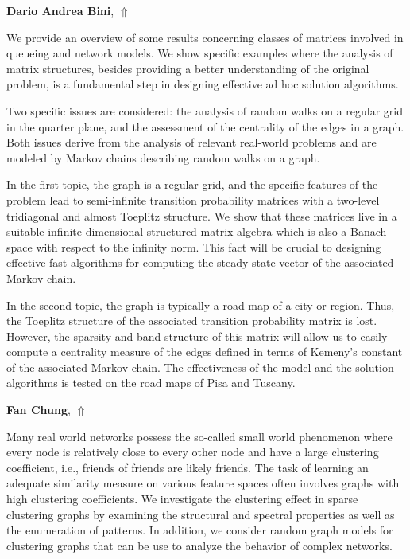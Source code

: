 \documentclass[ILAS2025-program.tex]{subfiles}
\begin{document}
\hypertarget{down0005}{}\begin{ilasabstract}
    
\textbf{Dario Andrea Bini},  \hfill \hyperlink{up0005}{$\Uparrow$}
    
    
\mtskip
    We provide an overview of some results concerning classes of matrices involved in queueing and network models. We show specific examples where the analysis of matrix structures, besides providing a better understanding of the original problem, is a fundamental step in designing effective ad hoc solution algorithms.

Two specific issues are considered:  the analysis of random walks on a regular grid in the quarter plane, and the assessment of the centrality of the edges in a graph. Both issues derive from the analysis of relevant real-world problems and are modeled by Markov chains describing random walks on a graph. 

In the first topic, the graph is a regular grid, and the specific features of the problem lead to semi-infinite transition probability matrices with a two-level tridiagonal and almost Toeplitz structure. We show that these matrices live in a suitable infinite-dimensional structured matrix algebra which is also a Banach space with respect to the infinity norm. This fact will be crucial to designing effective fast algorithms for computing the steady-state vector of the associated Markov chain.

In the second topic, the graph is typically a road map of a city or region. Thus, the Toeplitz structure of the associated transition probability matrix is lost. However, the sparsity and band structure of this matrix will allow us to easily compute a centrality measure of the edges defined in terms of Kemeny's constant of the associated Markov chain. The effectiveness of the model and the solution algorithms is tested on the road maps of Pisa and Tuscany.

\end{ilasabstract}
    

\hypertarget{down0006}{}\begin{ilasabstract}
    
\textbf{Fan Chung},  \hfill \hyperlink{up0006}{$\Uparrow$}
    
    
\mtskip
    Many real world networks possess the so-called small world phenomenon where every node is relatively close to every other node and have a large clustering coefficient, i.e., friends of friends are likely friends. The task of learning an adequate similarity measure on various feature spaces often involves  graphs with high clustering coefficients.
We investigate the clustering effect in sparse  clustering graphs by examining the structural and spectral  properties as well as the enumeration  of patterns. In addition, we consider random graph models for clustering graphs that can be use to analyze the behavior of complex networks.
\end{ilasabstract}
    
\end{document}
